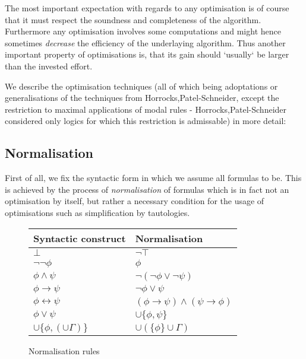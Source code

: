 \documentclass{llncs}
\begin{document}
The most important expectation with regards to any optimisation is of course that it must respect the soundness and
completeness of the algorithm. Furthermore any optimisation involves some computations and might hence
sometimes \emph{decrease} the efficiency of the underlaying algorithm. Thus another important property
of optimisations is, that its gain should `usually` be larger than the invested effort.


We describe the optimisation techniques (all of which being adoptations or generalisations of the
techniques from Horrocks,Patel-Schneider, except the restriction to maximal applications of modal rules -
Horrocks,Patel-Schneider considered only logics for which this restriction is admissable) in more detail:

\subsection{Normalisation}

First of all, we fix the syntactic form in which we assume all formulas to be. This is
achieved by the process of \emph{normalisation} of formulas which is in fact not an
optimisation by itself, but rather a necessary condition for the usage of
optimisations such as simplification by tautologies.

\begin{footnotesize}
\begin{figure}[!h]
  \begin{center}
\begin{tabular}{| l | l |}
\hline
Syntactic construct & Normalisation \\
\hline
$\bot$ & $\neg\top$ \\
$\neg\neg\phi$ & $\phi$ \\
$\phi\wedge\psi$ & $\neg(\neg\phi\vee\neg\psi)$ \\
$\phi\rightarrow\psi$ & $\neg\phi\vee \psi$ \\
$\phi\leftrightarrow\psi$ & $(\phi\rightarrow\psi)\wedge(\psi\rightarrow\phi)$ \\
$\phi\vee\psi$ & $\cup\{\phi,\psi\}$ \\
$\cup\{\phi,(\cup\Gamma)\}$ & $\cup(\{\phi\}\cup\Gamma)$ \\
\hline
 \end{tabular}
  \end{center}
  \caption{Normalisation rules}
  \label{fig:normalisation}
\end{figure}
\end{footnotesize}
\end{document}
